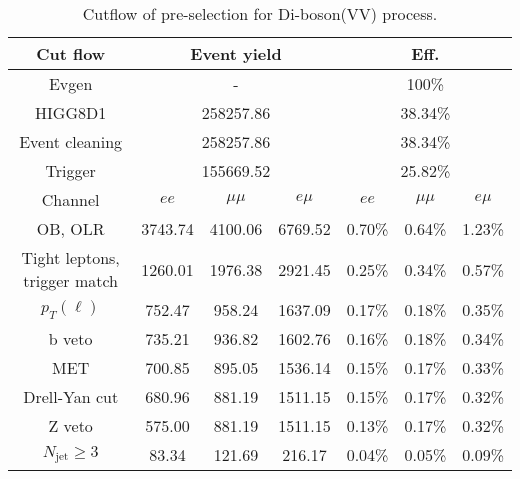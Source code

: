 \begin{table}
\centering\small
\begin{tabular}{c|ccc|ccc}
\hline
\hline
Cut flow &\multicolumn{3}{c|}{Event yield}&\multicolumn{3}{c}{Eff.}      \\
\hline
Evgen&\multicolumn{3}{c|}{-}&\multicolumn{3}{c}{100\%}\\
HIGG8D1&\multicolumn{3}{c|}{258257.86}&\multicolumn{3}{c}{38.34\%}\\
Event cleaning&\multicolumn{3}{c|}{258257.86}&\multicolumn{3}{c}{38.34\%}\\
Trigger&\multicolumn{3}{c|}{155669.52    }&\multicolumn{3}{c}{25.82\%}\\
Channel&$ee$&$\mu\mu$&$e\mu$&$ee$&$\mu\mu$&$e\mu$\\
\hline
OB, OLR    &3743.74    &4100.06    &6769.52& 0.70\%    &0.64\%    &1.23\%\\
Tight leptons, trigger match    &1260.01    &1976.38    &2921.45    &0.25\%    &0.34\%    &0.57\%\\
$p_T(\ell)$    &752.47    &958.24    &1637.09    &0.17\%    &0.18\%    &0.35\%\\
b veto    &735.21    &936.82    &1602.76    &0.16\%    &0.18\%    &0.34\%\\
MET    &700.85    &895.05    &1536.14    &0.15\%    &0.17\%    &0.33\%\\
Drell-Yan cut    &680.96    &881.19    &1511.15    &0.15\%    &0.17\%    &0.32\%\\
Z veto    &575.00    &881.19    &1511.15    &0.13\%    &0.17\%    &0.32\%\\
$N_{\text{jet}}\geq3$    &83.34    &121.69    &216.17    &0.04\%    &0.05\%    &0.09\%\\
\hline
\hline
\end{tabular}
\caption{Cutflow of pre-selection for Di-boson(VV) process.}
\label{tab:cut_flow_preselection_diboson}
\end{table}

